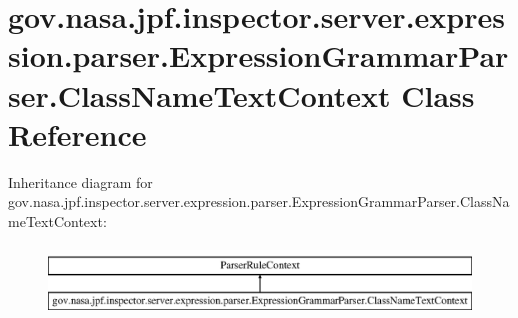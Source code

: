 \hypertarget{classgov_1_1nasa_1_1jpf_1_1inspector_1_1server_1_1expression_1_1parser_1_1_expression_grammar_pa73f78f15ab35f00cdc76079d9a864524}{}\section{gov.\+nasa.\+jpf.\+inspector.\+server.\+expression.\+parser.\+Expression\+Grammar\+Parser.\+Class\+Name\+Text\+Context Class Reference}
\label{classgov_1_1nasa_1_1jpf_1_1inspector_1_1server_1_1expression_1_1parser_1_1_expression_grammar_pa73f78f15ab35f00cdc76079d9a864524}
Inheritance diagram for gov.\+nasa.\+jpf.\+inspector.\+server.\+expression.\+parser.\+Expression\+Grammar\+Parser.\+Class\+Name\+Text\+Context\+:\begin{figure}[H]
\begin{center}
\leavevmode
\includegraphics[height=1.931034cm]{classgov_1_1nasa_1_1jpf_1_1inspector_1_1server_1_1expression_1_1parser_1_1_expression_grammar_pa73f78f15ab35f00cdc76079d9a864524}
\end{center}
\end{figure}
